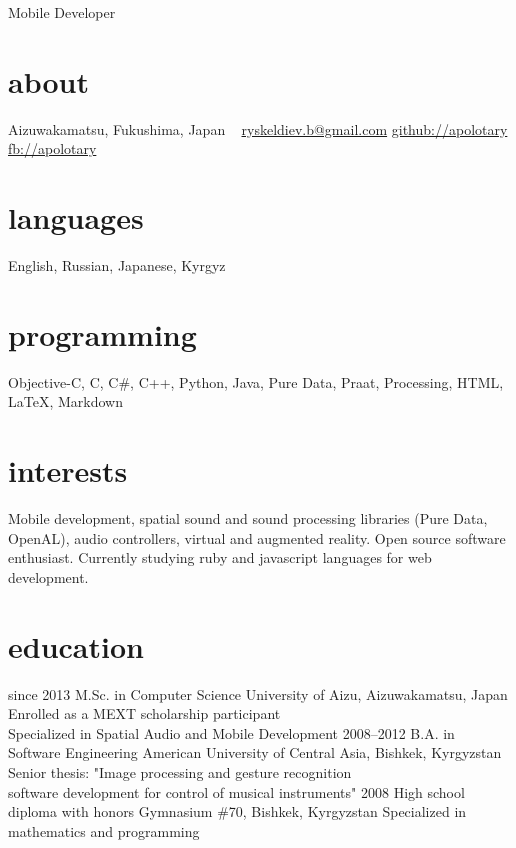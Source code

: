 \documentclass[]{friggeri-cv}
\begin{document}
       {Mobile Developer}

\begin{aside}
  \section{about}
    Aizuwakamatsu,
    Fukushima, Japan
    ~
    \href{mailto:ryskeldiev.b@gmail.com}{ryskeldiev.b@gmail.com}
    \href{https://github.com/Apolotary/}{github://apolotary}
    \href{http://facebook.com/apolotary}{fb://apolotary}
  \section{languages}
	English, Russian,
	Japanese, Kyrgyz
  \section{programming}
	Objective-C, C,  C\#,
	C++, Python, Java,
	Pure Data, Praat,
	Processing,
	HTML, LaTeX,
	Markdown
 \end{aside}

\section{interests}

Mobile development, spatial sound and sound processing libraries (Pure Data, OpenAL), audio controllers, virtual and augmented reality. Open source software enthusiast. Currently studying ruby and javascript languages for web development.

\section{education}

\begin{entrylist}
  \entry
    {since 2013}
    {M.Sc. in Computer Science}
    {University of Aizu, Aizuwakamatsu, Japan}
    {Enrolled as a MEXT scholarship participant\\
    Specialized in Spatial Audio and Mobile Development}
  \entry
    {2008–2012}
    {B.A. in Software Engineering}
    {American University of Central Asia, Bishkek, Kyrgyzstan}
    {Senior thesis: "Image processing and gesture recognition\\
     software development for control of musical instruments"}
  \entry
    {2008}
    {High school diploma with honors}
    {Gymnasium \#70, Bishkek, Kyrgyzstan}
    {Specialized in mathematics and programming}
\end{entrylist}
\end{document}
